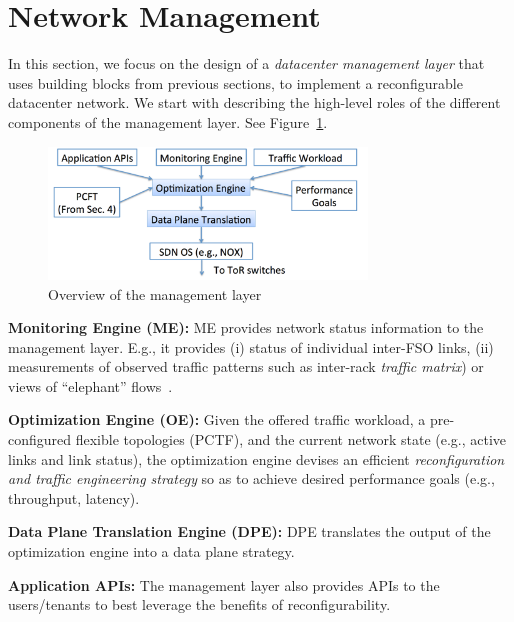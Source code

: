 \newpage

\section{\ArchName Network Management}
\label{sec:system}

In this section, we focus on the design of a {\em datacenter
  management layer} that uses building blocks from previous sections,
to implement a  reconfigurable datacenter network.
%
We start with describing the high-level roles of the different
components of the management layer. See Figure~\ref{fig:mgmt}.

\begin{figure}
\vspace{-0.4cm} 
\includegraphics[width=240pt]{PPTFigs/sysoverview-new.pdf}
\vspace{-0.4cm} 
\caption{Overview of the \ArchName management layer}
\vspace{-0.6cm} 
\label{fig:mgmt}
\end{figure}

\begin{packeditemize}
\item {\bf Monitoring Engine (ME):} ME provides network status
  information to the management layer. E.g., it provides (i) status of
  individual inter-FSO links, (ii) measurements of observed traffic
  patterns such as inter-rack {\em traffic matrix}) or views of
  ``elephant'' flows~\cite{hedera,devoflow,conext13ericson}.

\item {\bf Optimization Engine (OE):} Given the offered traffic
  workload, a pre-configured flexible topologies (PCTF), and the
  current network state (e.g., active links and link status), the
  optimization engine devises an efficient {\em reconfiguration and
    traffic engineering strategy} so as to achieve desired performance
  goals (e.g., throughput, latency).

\item {\bf Data Plane Translation Engine (DPE):} DPE translates the
  output of the optimization engine into a data plane strategy.

\item {\bf Application APIs:} The management layer also provides APIs
  to the users/tenants to best leverage the benefits of
  reconfigurability. 
\end{packeditemize}

